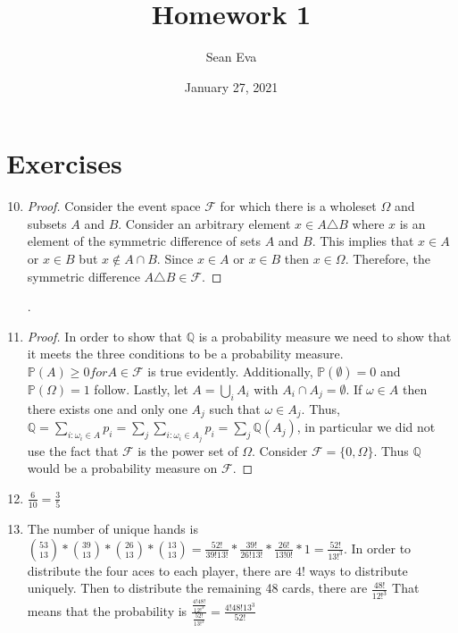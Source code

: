 \documentclass{article}
\title{Homework 1}
\author{Sean Eva}
\date{January 27, 2021}
\begin{document}
\maketitle

\section{Exercises}

\begin{enumerate}

    \setcounter{enumi}{9}
    \item
    \begin{proof}
    Consider the event space $\mathcal{F}$ for which there is a wholeset $\Omega$ and subsets $A$ and $B$. Consider an arbitrary element $x\in A \triangle B$ where $x$ is an element of the symmetric difference of sets $A$ and $B$. This implies that $x \in A$ or $x\in B$ but $x\notin A\cap B$. Since $x\in A$ or $x\in B$ then $x\in \Omega$. Therefore, the symmetric difference $A\triangle B \in \mathcal{F}$.
    \end{proof}.

    \setcounter{enumi}{16}
    \item 

    \begin{proof}
    In order to show that $\mathbb{Q}$ is a probability measure we need to show that it meets the three conditions to be a probability measure. $\mathbb{P}(A)\geq 0 for A\in \mathcal{F}$ is true evidently. Additionally, $\mathbb{P}(\emptyset)=0$ and $\mathbb{P}(\Omega)=1$ follow. Lastly, let $A=\bigcup_i A_i$ with $A_i\cap A_j=\emptyset$. If $\omega \in A$ then there exists one and only one $A_j$ such that $\omega \in A_j$. Thus, $\mathbb{Q} = \sum_{i: \omega_i \in A} p_i = \sum_j\sum_{i: \omega_i \in A_j} p_i=\sum_j\mathbb{Q}(A_j)$, in particular we did not use the fact that $\mathcal{F}$ is the power set of $\Omega$. Consider $\mathcal{F} = \{0, \Omega\}$. Thus $\mathbb{Q}$ would be a probability measure on $\mathcal{F}$.
    \end{proof}

    \setcounter{enumi}{20}
    \item 

    $\frac{6}{10} = \frac{3}{5}$

    \setcounter{enumi}{26}
    \item 

    The number of unique hands is $\binom{53}{13} * \binom{39}{13} * \binom{26}{13} * \binom{13}{13} = \frac{52!}{39!13!}*\frac{39!}{26!13!}*\frac{26!}{13!0!}*1=\frac{52!}{13!^3}$. In order to distribute the four aces to each player, there are $4!$ ways to distribute uniquely. Then to distribute the remaining 48 cards, there are $\frac{48!}{12!^3}$ That means that the probability is $\frac{\frac{4!48!}{12!^3}}{\frac{52!}{13!^3}}=\frac{4!48!13^3}{52!}$


\end{enumerate}
\end{document}
